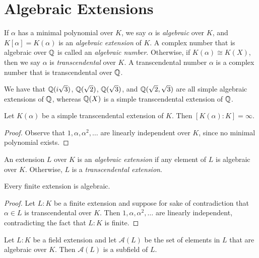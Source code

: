 \section{Algebraic Extensions}
\begin{definition}
  If $\alpha$ has a minimal polynomial over $K$,
  we say $\alpha$ is \emph{algebraic} over $K$, and
  $K[\alpha] = K(\alpha)$ is an \emph{algebraic extension} of $K$.
  A complex number that is algebraic over $\mathbb{Q}$
  is called an \emph{algebraic number}.
  Otherwise, if $K(\alpha) \cong K(X)$, then we say
  $\alpha$ is
  \emph{transcendental} over $K$. A transcendental
  number $\alpha$ is a complex number that is
  transcendental over $\mathbb{Q}$.
\end{definition}

\begin{example}
  We have that $\mathbb{Q}(i\sqrt{3})$, $\mathbb{Q}(\sqrt{2})$, $\mathbb{Q}(\sqrt{3})$, and
  $\mathbb{Q}(\sqrt{2}, \sqrt{3})$ are all simple algebraic
  extensions of $\mathbb{Q}$, whereas $\mathbb{Q}(X)$ is a simple
  transcendental extension of $\mathbb{Q}$.
\end{example}

\begin{theorem}
  Let $K(\alpha)$ be a simple transcendental extension
  of $K$. Then $[K(\alpha) : K] = \infty$.
\end{theorem}

\begin{proof}
  Observe that $1, \alpha, \alpha^2, \dots$ are
  linearly independent over $K$, since no minimal
  polynomial exists.
\end{proof}

\begin{definition}
  An extension $L$ over $K$ is an \emph{algebraic extension}
  if any element of $L$ is algebraic over $K$. Otherwise,
  $L$ is a \emph{transcendental extension}.
\end{definition}

\begin{theorem}
  Every finite extension is algebraic.
\end{theorem}

\begin{proof}
  Let $L : K$ be a finite extension and suppose for
  sake of contradiction that $\alpha \in L$ is
  transcendental over $K$. Then
  $1, \alpha, \alpha^2, \dots$ are linearly independent,
  contradicting the fact that $L : K$ is finite.
\end{proof}

\begin{theorem}
  Let $L : K$ be a field extension and let
  $\mathcal{A}(L)$ be the set of elements in $L$ that
  are algebraic over $K$. Then $\mathcal{A}(L)$ is a
  subfield of $L$.
\end{theorem}

